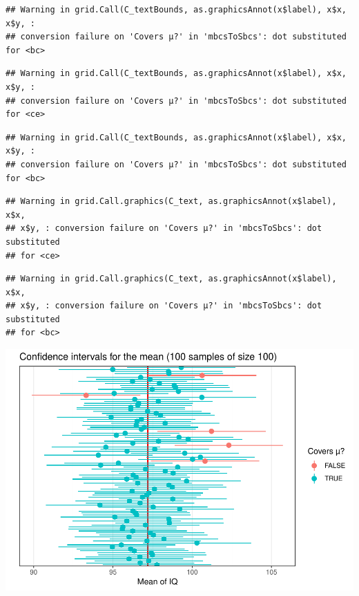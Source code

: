 \documentclass[]{book}
\theoremstyle{definition}
\theoremstyle{definition}
\theoremstyle{definition}
\theoremstyle{remark}
\begin{document}
\begin{verbatim}
## Warning in grid.Call(C_textBounds, as.graphicsAnnot(x$label), x$x, x$y, :
## conversion failure on 'Covers μ?' in 'mbcsToSbcs': dot substituted for <bc>
\end{verbatim}

\begin{verbatim}
## Warning in grid.Call(C_textBounds, as.graphicsAnnot(x$label), x$x, x$y, :
## conversion failure on 'Covers μ?' in 'mbcsToSbcs': dot substituted for <ce>
\end{verbatim}

\begin{verbatim}
## Warning in grid.Call(C_textBounds, as.graphicsAnnot(x$label), x$x, x$y, :
## conversion failure on 'Covers μ?' in 'mbcsToSbcs': dot substituted for <bc>
\end{verbatim}

\begin{verbatim}
## Warning in grid.Call.graphics(C_text, as.graphicsAnnot(x$label), x$x,
## x$y, : conversion failure on 'Covers μ?' in 'mbcsToSbcs': dot substituted
## for <ce>
\end{verbatim}

\begin{verbatim}
## Warning in grid.Call.graphics(C_text, as.graphicsAnnot(x$label), x$x,
## x$y, : conversion failure on 'Covers μ?' in 'mbcsToSbcs': dot substituted
## for <bc>
\end{verbatim}

\includegraphics{05-inference_files/figure-latex/unnamed-chunk-24-1.pdf}
\end{document}
